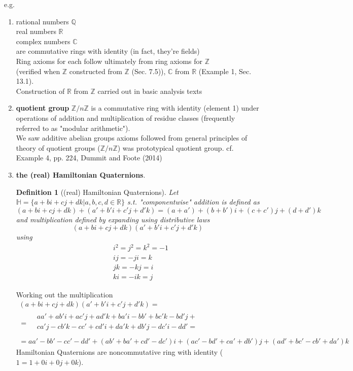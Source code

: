 \documentclass[10pt]{amsart}
\newtheorem{definition}{Definition}
\begin{document}
\begin{multicols*}{2}
e.g. 
\begin{enumerate}
	\item rational numbers $\mathbb{Q}$ \\
	real numbers $\mathbb{R}$ \\
	complex numbers $\mathbb{C}$ \\ 
	are commutative rings with identity (in fact, they're fields) \\
	Ring axioms for each follow ultimately from ring axioms for $\mathbb{Z}$ \\
	(verified when $\mathbb{Z}$ constructed from $\mathbb{Z}$ (Sec. 7.5)), $\mathbb{C}$ from $\mathbb{R}$ (Example 1, Sec. 13.1). \\
	Construction of $\mathbb{R}$ from $\mathbb{Z}$ carried out in basic analysis texts
	\item \textbf{quotient group} $\mathbb{Z}/n\mathbb{Z}$ is a commutative ring with identity (element 1) under operations of addition and multiplication of residue classes (frequently referred to as "modular arithmetic").  \\
	We saw additive abelian groups axioms followed from general principles of theory of quotient groups ($\mathbb{Z}/n\mathbb{Z}$) was prototypical quotient group. cf. Example 4, pp. 224, Dummit and Foote (2014)\cite{DuFo2003}
	\item \textbf{the (real) Hamiltonian Quaternions}.  
	\begin{definition}[(real) Hamiltonian Quaternions]
		Let $\mathbb{H} = \lbrace a+ bi + cj + dk | a,b,c,d \in \mathbb{R} \rbrace$ s.t. 
		"componentwise" addition is defined as 
		\begin{equation}
		(a+bi + cj+dk) + (a' + b'i + c'j + d'k) = (a+a') + (b+b')i + (c+c')j + (d+d')k
		\end{equation} and multiplication defined by expanding using distributive laws 
		\[
		(a+bi + cj +dk)(a' + b'i + c'j +d' k)
		\]
		using 
		\begin{equation}
		\begin{aligned}
		& i^2 = j^2 =k^2 = -1 \\
		& ij = -ji = k \\
		& jk = -kj = i \\
		& ki = -ik = j
		\end{aligned}
		\end{equation}
	\end{definition}
Working out the multiplication
\[
\begin{gathered}
(a+bi + cj + dk)(a'+b'i + c'j + d'k) =  \\
= \begin{aligned}
& aa' + ab' i + ac'j + ad'k + ba' i - bb' + bc' k -bd' j + \\
& ca'j - cb' k - cc' + cd' i + da' k + db' j - dc' i -dd' = \\
\end{aligned} \\
= aa' - bb' -cc' -dd' + (ab' + ba' + cd' -dc')i + (ac' - bd' + ca' +db')j + (ad' + bc' - cb' + da')k 
\end{gathered}
\]
Hamiltonian Quaternions are noncommutative ring with identity ($1= 1 + 0i + 0j + 0k$). 


\end{enumerate}
\end{multicols*}
\end{document}
